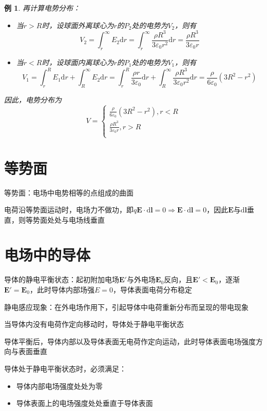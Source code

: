 \documentclass[12pt, a4paper, twoside]{ctexbook}
\newtheorem{example}[theorem]{例}
\begin{document}
\begin{example}
    {\sonti 再计算电势分布}：
    \begin{itemize}
        \item 当$r>R$时，设球面外离球心为$r$的$P_2$处的电势为$V_2$，则有
        $$
        V_2=\int_{r}^{\infty}E_2\mathrm{d}r=\int_{r}^{\infty}\frac{\rho R^3}{3\varepsilon_0r^2}\mathrm{d}r=\frac{\rho R^3}{3\varepsilon_0r}
        $$
        \item 当$r<R$时，设球面内离球心为$r$的$P_1$处的电势为$V_1$，则有
        $$
        V_1=\int_{r}^{R}E_1\mathrm{d}r+\int_{R}^{\infty}E_2\mathrm{d}r=\int_{r}^{R}\frac{\rho r}{3\varepsilon_0}\mathrm{d}r+\int_{R}^{\infty}\frac{\rho R^3}{3\varepsilon_0r^2}\mathrm{d}r=\frac{\rho}{6\varepsilon_0}\left(3R^2-r^2\right)
        $$
    \end{itemize}
    
    因此，电势分布为
    $$
    V=\left\{ \begin{array}{l}
        \frac{\rho}{6\varepsilon_0}\left(3R^2-r^2\right),r<R\\
        \frac{\rho R^3}{3\varepsilon_0r},r>R\\
    \end{array} \right. 
    $$
\end{example}
\section{等势面}
{\sonti 等势面}：电场中电势相等的点组成的曲面

电荷沿等势面运动时，电场力不做功，即$q\boldsymbol{E}\cdot\mathrm{d}\boldsymbol{l}=0 \Rightarrow \boldsymbol{E}\cdot\mathrm{d}\boldsymbol{l}=0$，因此$\boldsymbol{E}$与$\mathrm{d}\boldsymbol{l}$垂直，则等势面处处与电场线垂直
\section{电场中的导体}
{\sonti 导体的静电平衡状态}：起初附加电场$\boldsymbol{E'}$与外电场$\boldsymbol{E}_0$反向，且$\boldsymbol{E'}<\boldsymbol{E}_0$，逐渐$\boldsymbol{E'}=\boldsymbol{E}_0$，此时导体内部场强$E=0$，导体表面电荷分布稳定

{\sonti 静电感应现象}：在外电场作用下，引起导体中电荷重新分布而呈现的带电现象

当导体内没有电荷作定向移动时，导体处于静电平衡状态

导体平衡后，导体内部以及导体表面无电荷作定向运动，此时导体表面电场强度方向与表面垂直

导体处于静电平衡状态时，必须满足：
\begin{itemize}
    \item 导体内部电场强度处处为零
    \item 导体表面上的电场强度处处垂直于导体表面
\end{itemize}
\end{document}
